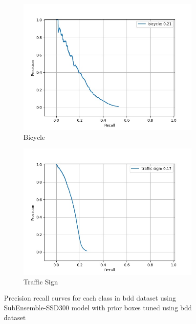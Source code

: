 \begin{figure}[ht]
        \begin{center}
    	\begin{subfigure}[t]{0.325\textwidth}
    		\centering
    		\includegraphics[width=\textwidth]{images/sub_ens_pr/class_bicycle_pr.jpg}
    		\caption{Bicycle}
    	\end{subfigure}
    	\begin{subfigure}[t]{0.325\textwidth}
    		\centering
    		\includegraphics[width=\textwidth]{images/sub_ens_pr/class_traffic sign_pr.jpg}
    		\caption{Traffic Sign}
    	\end{subfigure}
    	\end{center}
        \vspace*{-3mm}
        \caption[PR curves of Sub-Ensemble based SSD300 model]{Precision recall curves for each class in \acrshort{bdd} dataset using SubEnsemble-SSD300 model with prior boxes tuned using \acrshort{bdd} dataset}
        \label{fig:pr_subens}
    \end{figure}
    \newpage
